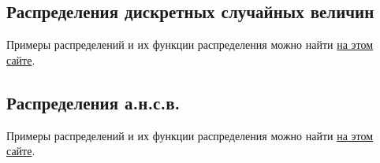 
\subsection{Распределения дискретных случайных величин}

Примеры распределений и их функции распределения можно найти \href{https://tvims.nsu.ru/chernova/tv/lec/node26.html}{на этом сайте}.

\subsection{Распределения а.н.с.в.}

Примеры распределений и их функции распределения можно найти \href{https://tvims.nsu.ru/chernova/tv/lec/node27.html}{на этом сайте}.



\newpage